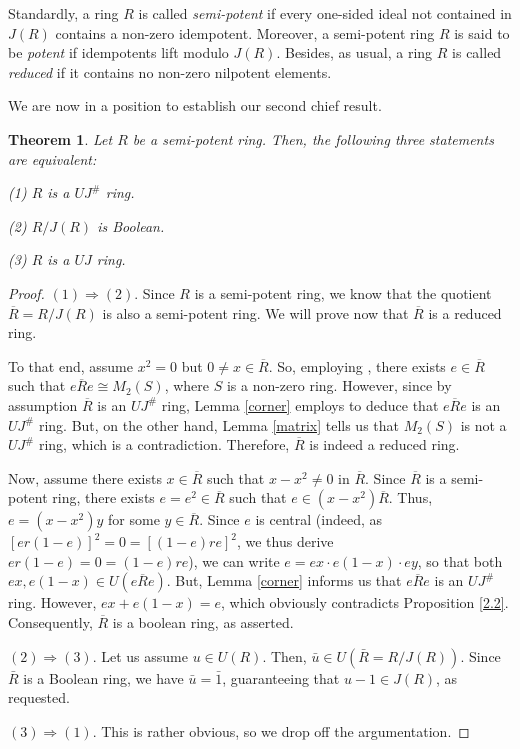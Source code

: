 \documentclass[12pt]{amsart}
\newtheorem{theorem}{Theorem}[section]
\theoremstyle{definition}
\begin{document}
Standardly, a ring $R$ is called {\it semi-potent} if every one-sided ideal not contained in $J(R)$ contains a non-zero idempotent. Moreover, a semi-potent ring $R$ is said to be {\it potent} if idempotents lift modulo $J(R)$. Besides, as usual, a ring $R$ is called {\it reduced} if it contains no non-zero nilpotent elements.

\medskip

We are now in a position to establish our second chief result.

\begin{theorem}\label{2.4}
Let \( R \) be a semi-potent ring. Then, the following three statements are equivalent:

(1) \( R \) is a $UJ^{\#}$ ring.

(2) \( R/J(R) \) is Boolean.

(3) \( R \) is a \( UJ \) ring.
\end{theorem}

\begin{proof}
\( (1) \Rightarrow (2) \). Since $R$ is a semi-potent ring, we know that the quotient $\overline{R} = R/J(R)$ is also a semi-potent ring. We will prove now that $\overline{R}$ is a reduced ring.

To that end, assume $x^2 = 0$ but $0 \neq x \in \overline{R}$. So, employing \cite[Theorem 2.1]{Levi}, there exists $e \in \overline{R}$ such that $e\overline{R}e \cong M_2(S)$, where $S$ is a non-zero ring. However, since by assumption $\overline{R}$ is an $UJ^{\#}$ ring, Lemma \ref{corner} employs to deduce that $e\overline{R}e$ is an $UJ^{\#}$ ring. But, on the other hand, Lemma \ref{matrix} tells us that $M_2(S)$ is not a $UJ^{\#}$ ring, which is a contradiction. Therefore, $\overline{R}$ is indeed a reduced ring.

Now, assume there exists $x \in \overline{R}$ such that $x - x^2 \neq 0$ in $\overline{R}$. Since $\overline{R}$ is a semi-potent ring, there exists $e = e^2 \in \overline{R}$ such that $e \in (x - x^2)\overline{R}$. Thus, $e = (x - x^2)y$ for some $y \in \overline{R}$. Since $e$ is central (indeed, as $[er(1-e)]^2 = 0 = [(1-e)re]^2$, we thus derive $er(1-e) = 0 = (1-e)re$), we can write $e = ex \cdot e(1-x) \cdot ey$, so that both $ex, e(1-x) \in U(e\overline{R}e)$. But, Lemma \ref{corner} informs us that $e\overline{R}e$ is an $UJ^{\#}$ ring. However, $ex + e(1-x) = e$, which obviously contradicts Proposition \ref{2.2}. Consequently, $\overline{R}$ is a boolean ring, as asserted.
	
\( (2) \Rightarrow (3) \). Let us assume \( u \in U(R) \). Then, \( \bar{u} \in U(\bar{R} = R/J(R)) \). Since \( \bar{R} \) is a Boolean ring, we have \( \bar{u} = \bar{1} \), guaranteeing that \( u-1 \in J(R) \), as requested.
	
\( (3) \Rightarrow (1) \). This is rather obvious, so we drop off the argumentation.
\end{proof}
\end{document}
